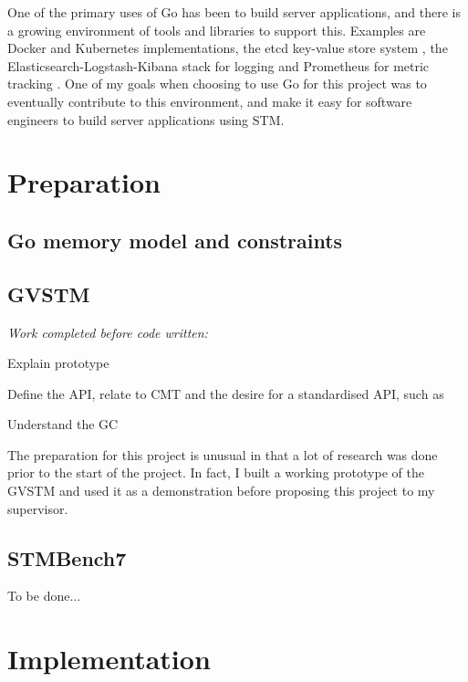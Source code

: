 \documentclass[12pt,a4paper,twoside,openright]{report}
\newcommand{\TOBEDONE}{{\LARGE To be done...}}
\begin{document}
One of the primary uses of Go has been to build server applications,
and there is a growing environment of tools and libraries to support
this. Examples are Docker and Kubernetes implementations, the etcd
key-value store system \cite{etcd}, the Elasticsearch-Logstash-Kibana
stack for logging \cite{ELK} and Prometheus for metric tracking
\cite{Prom}. One of my goals when choosing to use Go for this project
was to eventually contribute to this environment, and make it easy for
software engineers to build server applications using STM.


\chapter{Preparation}

\section{Go memory model and constraints}
\label{sec:go-memory-model}

\section{GVSTM}
\label{sec:prep:gvstm}

{ \em Work completed before code written:

  Explain prototype

  Define the API, relate to CMT and the desire for a standardised API,
  such as

  Understand the GC }

The preparation for this project is unusual in that a lot of research
was done prior to the start of the project. In fact, I built a working
prototype of the GVSTM and used it as a demonstration before proposing
this project to my supervisor.

\section{STMBench7}
\label{sec:prep:stmbench7}


\TOBEDONE


\chapter{Implementation}
\end{document}

